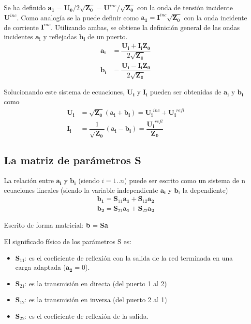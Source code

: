 Se ha definido $\bm{a_1} = \bm{U_0}/2\sqrt{\bm{Z_0}} = \bm{U}^{inc}/\sqrt{\bm{Z_0}}$ con la onda de tensión incidente $\bm{U}^{inc}$. Como analogía se la puede definir como $\bm{a_1} = \bm{I}^{inc}\sqrt{\bm{Z_0}}$ con la onda incidente de corriente $\bm{I}^{inc}$. Utilizando ambas, se obtiene la definición general de las ondas incidentes $\bm{a_i}$ y reflejadas $\bm{b_i}$ de un puerto.
\begin{equation}
\begin{aligned}
  \bm{a_i} &= \dfrac{\bm{U_i} + \bm{I_i}\bm{Z_0}}{2\sqrt{\bm{Z_0}}} \\
  \bm{b_i} &= \dfrac{\bm{U_i} - \bm{I_i}\bm{Z_0}}{2\sqrt{\bm{Z_0}}}
\end{aligned}
\label{eq:waves}
\end{equation}

Solucionando este sistema de ecuaciones, $\bm{U_i}$ y $\bm{I_i}$ pueden ser obtenidas de $\bm{a_i}$ y $\bm{b_i}$ como
\begin{equation}
\begin{aligned}
  \bm{U_i} &= \sqrt{\bm{Z_0}}(\bm{a_i} + \bm{b_i}) = \bm{U_i}^{inc} + \bm{U_i}^{refl}\\
  \bm{I_i} &= \dfrac{1}{\sqrt{\bm{Z_0}}}(\bm{a_i} - \bm{b_i}) = \dfrac{\bm{U_i}^{refl}}{\bm{Z_0}}
\end{aligned}
\end{equation}


\subsection{La matriz de parámetros S}

La relación entre $\bm{a_i}$ y $\bm{b_i}$ (siendo $i=1..n$) puede ser escrito como un sistema de n ecuaciones lineales (siendo la variable independiente $\bm{a_i}$ y $\bm{b_i}$ la dependiente)
\begin{equation}
\begin{aligned}
  \bm{b_1} = \bm{S}_{11}\bm{a_1} + \bm{S}_{12}\bm{a_2} \\
  \bm{b_2} = \bm{S}_{21}\bm{a_1} + \bm{S}_{22}\bm{a_2}
\end{aligned}
\label{eq:s_matrix}
\end{equation}

Escrito de forma matricial: \textbf{b} = \textbf{Sa}

El significado físico de los parámetros S es:
\begin{itemize}
  \item $\bm{S}_{11}$: es el coeficiente de reflexión con la salida de la red terminada en una carga adaptada ($\bm{a_2} = 0$).
  \item $\bm{S}_{21}$: es la transmisión en directa (del puerto 1 al 2)
  \item $\bm{S}_{12}$: es la transmisión en inversa (del puerto 2 al 1)
  \item $\bm{S}_{22}$: es el coeficiente de reflexión de la salida.
\end{itemize}

